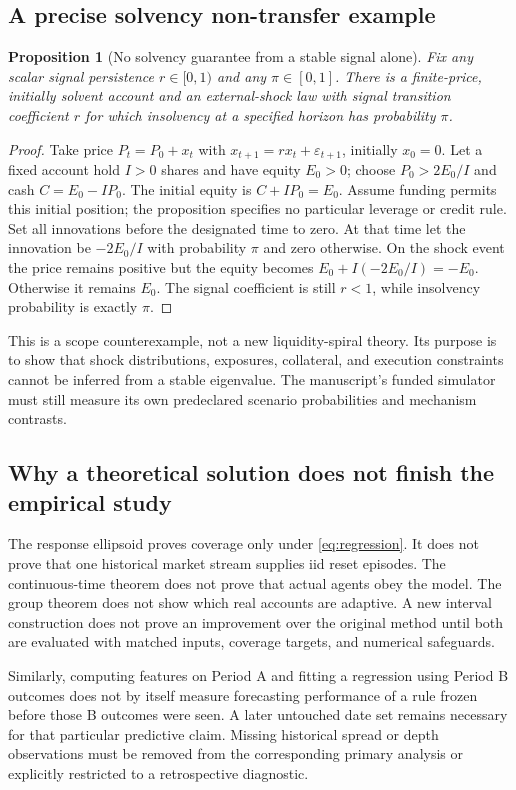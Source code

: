 \documentclass[11pt,a4paper]{article}
\newtheorem{proposition}[theorem]{Proposition}
\theoremstyle{definition}\newtheorem{definition}[theorem]{Definition}
\theoremstyle{remark}\newtheorem{remark}[theorem]{Remark}
\begin{document}
\subsection{A precise solvency non-transfer example}
\begin{proposition}[No solvency guarantee from a stable signal alone]\label{prop:solvency}
Fix any scalar signal persistence $r\in[0,1)$ and any $\pi\in[0,1]$. There is a finite-price, initially solvent account and an external-shock law with signal transition coefficient $r$ for which insolvency at a specified horizon has probability $\pi$.
\end{proposition}
\begin{proof}
Take price $P_t=P_0+x_t$ with $x_{t+1}=r x_t+\varepsilon_{t+1}$, initially $x_0=0$. Let a fixed account hold $I>0$ shares and have equity $E_0>0$; choose $P_0>2E_0/I$ and cash $C=E_0-IP_0$. The initial equity is $C+IP_0=E_0$. Assume funding permits this initial position; the proposition specifies no particular leverage or credit rule.
Set all innovations before the designated time to zero. At that time let the innovation be $-2E_0/I$ with probability $\pi$ and zero otherwise. On the shock event the price remains positive but the equity becomes
$E_0+I(-2E_0/I)=-E_0$. Otherwise it remains $E_0$. The signal coefficient is still $r<1$, while insolvency probability is exactly $\pi$.
\end{proof}
This is a scope counterexample, not a new liquidity-spiral theory. Its purpose is to show that shock distributions, exposures, collateral, and execution constraints cannot be inferred from a stable eigenvalue. The manuscript's funded simulator must still measure its own predeclared scenario probabilities and mechanism contrasts.

\subsection{Why a theoretical solution does not finish the empirical study}
The response ellipsoid proves coverage only under \eqref{eq:regression}. It does not prove that one historical market stream supplies iid reset episodes. The continuous-time theorem does not prove that actual agents obey the model. The group theorem does not show which real accounts are adaptive. A new interval construction does not prove an improvement over the original method until both are evaluated with matched inputs, coverage targets, and numerical safeguards.

Similarly, computing features on Period A and fitting a regression using Period B outcomes does not by itself measure forecasting performance of a rule frozen before those B outcomes were seen. A later untouched date set remains necessary for that particular predictive claim. Missing historical spread or depth observations must be removed from the corresponding primary analysis or explicitly restricted to a retrospective diagnostic.
\end{document}

